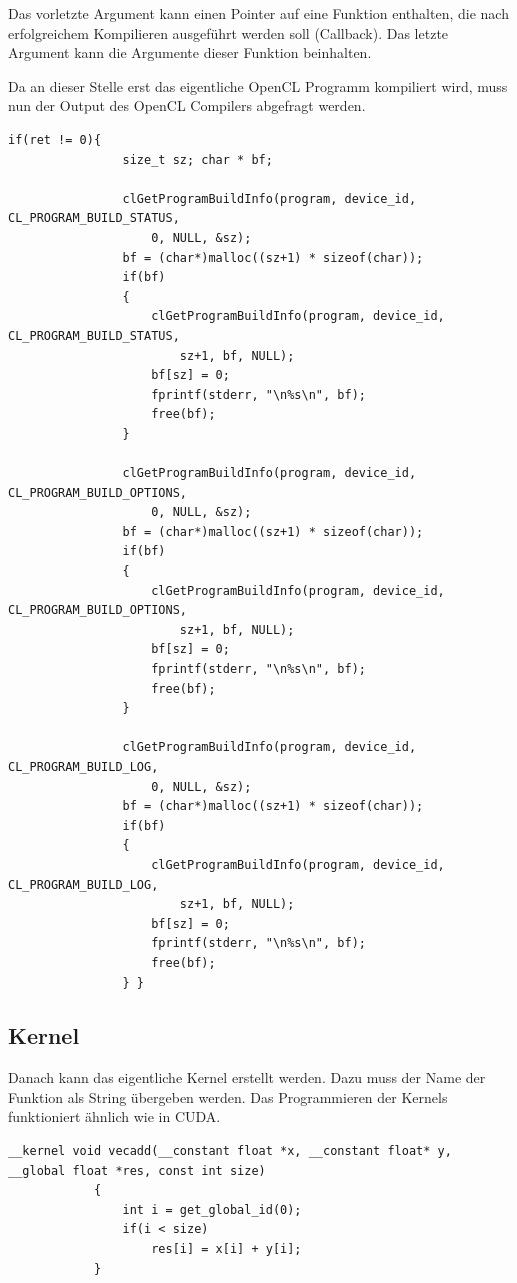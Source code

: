 			Das vorletzte Argument kann einen Pointer auf eine Funktion enthalten, die nach erfolgreichem Kompilieren ausgeführt werden soll (Callback). Das letzte Argument kann die Argumente dieser Funktion beinhalten.
			
			Da an dieser Stelle erst das eigentliche OpenCL Programm kompiliert wird, muss nun der Output des OpenCL Compilers abgefragt werden.
			
			\newpage			
			\begin{lstlisting}[caption=Fehlerabfrage OpenCL Compiler]
			if(ret != 0){
				size_t sz; char * bf;

				clGetProgramBuildInfo(program, device_id, CL_PROGRAM_BUILD_STATUS, 
					0, NULL, &sz);
				bf = (char*)malloc((sz+1) * sizeof(char));
				if(bf)
				{
					clGetProgramBuildInfo(program, device_id, CL_PROGRAM_BUILD_STATUS, 
						sz+1, bf, NULL);
					bf[sz] = 0;
					fprintf(stderr, "\n%s\n", bf);
					free(bf);
				}

				clGetProgramBuildInfo(program, device_id, CL_PROGRAM_BUILD_OPTIONS, 
					0, NULL, &sz);
				bf = (char*)malloc((sz+1) * sizeof(char));
				if(bf)
				{
					clGetProgramBuildInfo(program, device_id, CL_PROGRAM_BUILD_OPTIONS, 
						sz+1, bf, NULL);
					bf[sz] = 0;
					fprintf(stderr, "\n%s\n", bf);
					free(bf);
				}
				
				clGetProgramBuildInfo(program, device_id, CL_PROGRAM_BUILD_LOG, 
					0, NULL, &sz);
				bf = (char*)malloc((sz+1) * sizeof(char));
				if(bf)
				{
					clGetProgramBuildInfo(program, device_id, CL_PROGRAM_BUILD_LOG, 
						sz+1, bf, NULL);
					bf[sz] = 0;
					fprintf(stderr, "\n%s\n", bf);
					free(bf);
				} }
			\end{lstlisting}
			
			\newpage
			
			\subsection{Kernel}
			Danach kann das eigentliche \Gls{Kernel} erstellt werden. Dazu muss der Name der Funktion als String übergeben werden. Das Programmieren der Kernels funktioniert ähnlich wie in CUDA.			
			\begin{lstlisting}[caption=Kerneldefinition]
			__kernel void vecadd(__constant float *x, __constant float* y, __global float *res, const int size)
			{
  				int i = get_global_id(0);
  				if(i < size)
    				res[i] = x[i] + y[i];
			}
			\end{lstlisting}
			
